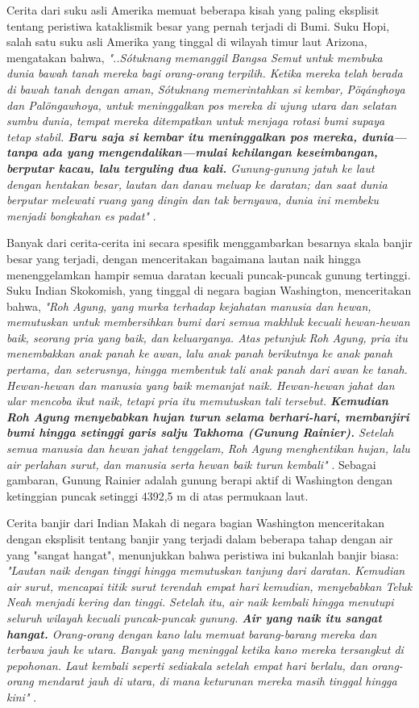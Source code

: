\documentclass[10pt,twocolumn,letterpaper]{article}
\begin{document}
Cerita dari suku asli Amerika memuat beberapa kisah yang paling eksplisit tentang peristiwa kataklismik besar yang pernah terjadi di Bumi. Suku Hopi, salah satu suku asli Amerika yang tinggal di wilayah timur laut Arizona, mengatakan bahwa, \textit{"..Sótuknang memanggil Bangsa Semut untuk membuka dunia bawah tanah mereka bagi orang-orang terpilih. Ketika mereka telah berada di bawah tanah dengan aman, Sótuknang memerintahkan si kembar, Pöqánghoya dan Palöngawhoya, untuk meninggalkan pos mereka di ujung utara dan selatan sumbu dunia, tempat mereka ditempatkan untuk menjaga rotasi bumi supaya tetap stabil. \textbf{Baru saja si kembar itu meninggalkan pos mereka, dunia—tanpa ada yang mengendalikan—mulai kehilangan keseimbangan, berputar kacau, lalu terguling dua kali.} Gunung-gunung jatuh ke laut dengan hentakan besar, lautan dan danau meluap ke daratan; dan saat dunia berputar melewati ruang yang dingin dan tak bernyawa, dunia ini membeku menjadi bongkahan es padat"} \cite{4}.

Banyak dari cerita-cerita ini secara spesifik menggambarkan besarnya skala banjir besar yang terjadi, dengan menceritakan bagaimana lautan naik hingga menenggelamkan hampir semua daratan kecuali puncak-puncak gunung tertinggi. Suku Indian Skokomish, yang tinggal di negara bagian Washington, menceritakan bahwa, \textit{"Roh Agung, yang murka terhadap kejahatan manusia dan hewan, memutuskan untuk membersihkan bumi dari semua makhluk kecuali hewan-hewan baik, seorang pria yang baik, dan keluarganya. Atas petunjuk Roh Agung, pria itu menembakkan anak panah ke awan, lalu anak panah berikutnya ke anak panah pertama, dan seterusnya, hingga membentuk tali anak panah dari awan ke tanah. Hewan-hewan dan manusia yang baik memanjat naik. Hewan-hewan jahat dan ular mencoba ikut naik, tetapi pria itu memutuskan tali tersebut. \textbf{Kemudian Roh Agung menyebabkan hujan turun selama berhari-hari, membanjiri bumi hingga setinggi garis salju Takhoma (Gunung Rainier).} Setelah semua manusia dan hewan jahat tenggelam, Roh Agung menghentikan hujan, lalu air perlahan surut, dan manusia serta hewan baik turun kembali"} \cite{3}. Sebagai gambaran, Gunung Rainier adalah gunung berapi aktif di Washington dengan ketinggian puncak setinggi 4392,5 m di atas permukaan laut.

Cerita banjir dari Indian Makah di negara bagian Washington menceritakan dengan eksplisit tentang banjir yang terjadi dalam beberapa tahap dengan air yang "sangat hangat", menunjukkan bahwa peristiwa ini bukanlah banjir biasa: \textit{"Lautan naik dengan tinggi hingga memutuskan tanjung dari daratan. Kemudian air surut, mencapai titik surut terendah empat hari kemudian, menyebabkan Teluk Neah menjadi kering dan tinggi. Setelah itu, air naik kembali hingga menutupi seluruh wilayah kecuali puncak-puncak gunung. \textbf{Air yang naik itu sangat hangat.} Orang-orang dengan kano lalu memuat barang-barang mereka dan terbawa jauh ke utara. Banyak yang meninggal ketika kano mereka tersangkut di pepohonan. Laut kembali seperti sediakala setelah empat hari berlalu, dan orang-orang mendarat jauh di utara, di mana keturunan mereka masih tinggal hingga kini"} \cite{3}.
\end{document}
